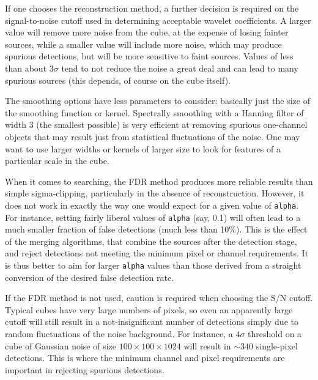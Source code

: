 If one chooses the reconstruction method, a further decision is
required on the signal-to-noise cutoff used in determining acceptable
wavelet coefficients. A larger value will remove more noise from the
cube, at the expense of losing fainter sources, while a smaller value
will include more noise, which may produce spurious detections, but
will be more sensitive to faint sources. Values of less than about
$3\sigma$ tend to not reduce the noise a great deal and can lead to
many spurious sources (this depends, of course on the cube itself).

The smoothing options have less parameters to consider: basically just
the size of the smoothing function or kernel. Spectrally smoothing
with a Hanning filter of width 3 (the smallest possible) is very
efficient at removing spurious one-channel objects that may result
just from statistical fluctuations of the noise. One may want to use
larger widths or kernels of larger size to look for features of a
particular scale in the cube.

When it comes to searching, the FDR method produces more reliable
results than simple sigma-clipping, particularly in the absence of
reconstruction.  However, it does not work in exactly the way one
would expect for a given value of \texttt{alpha}. For instance,
setting fairly liberal values of \texttt{alpha} (say, 0.1) will often
lead to a much smaller fraction of false detections (\ie much less
than 10\%). This is the effect of the merging algorithms, that combine
the sources after the detection stage, and reject detections not
meeting the minimum pixel or channel requirements.  It is thus better
to aim for larger \texttt{alpha} values than those derived from a
straight conversion of the desired false detection rate.

If the FDR method is not used, caution is required when choosing the
S/N cutoff. Typical cubes have very large numbers of pixels, so even
an apparently large cutoff will still result in a not-insignificant
number of detections simply due to random fluctuations of the noise
background. For instance, a $4\sigma$ threshold on a cube of Gaussian
noise of size $100\times100\times1024$ will result in $\sim340$
single-pixel detections. This is where the minimum channel and pixel
requirements are important in rejecting spurious detections.

